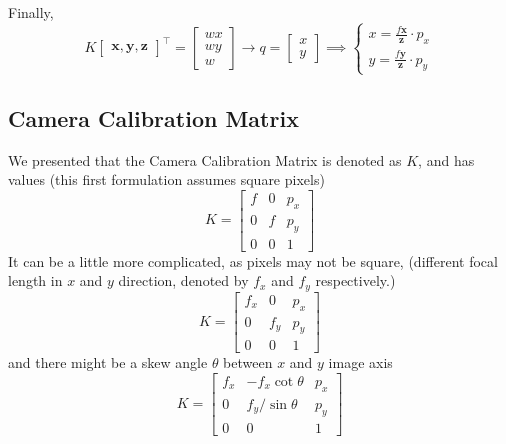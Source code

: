 \documentclass[11pt]{article}
\newcommand{\bx}{\mathbf{x}}
\newcommand{\by}{\mathbf{y}}
\newcommand{\bz}{\mathbf{z}}
\begin{document}
Finally,
\begin{equation}
	K \begin{bmatrix}
		\bx, \by, \bz
	\end{bmatrix}^\top = \begin{bmatrix}
		wx \\ wy \\ w
	\end{bmatrix} \rightarrow q = \begin{bmatrix}
		x \\y 
	\end{bmatrix} \implies \begin{cases}
		x = \frac{f\bx}{\bz} \cdot p_{x} \\
		y = \frac{f\by}{\bz} \cdot p_{y}
	\end{cases}
\end{equation}

\subsection{Camera Calibration Matrix}
We presented that the Camera Calibration Matrix is denoted as $K$, and has values (this first formulation assumes square pixels)
\begin{equation}
	K = \begin{bmatrix}
		f & 0 & p_x \\
		0 & f & p_y \\
		0 & 0 & 1
	\end{bmatrix}
\end{equation}
It can be a little more complicated, as pixels may not be square, (different focal length in $x$ and $y$ direction, denoted by $f_x$ and $f_y$ respectively.) 
\begin{equation}
	K = \begin{bmatrix}
		f_x & 0 & p_x \\
		0 & f_y & p_y \\
		0 & 0 & 1
	\end{bmatrix}
\end{equation}
and there might be a skew angle $\theta$ between $x$ and $y$ image axis
\begin{equation}
	K = \begin{bmatrix}
		f_x & -f_x\cot \theta & p_x \\
		0 & f_y / \sin\theta & p_y \\
		0 & 0 & 1
	\end{bmatrix}
\end{equation}
\end{document}
